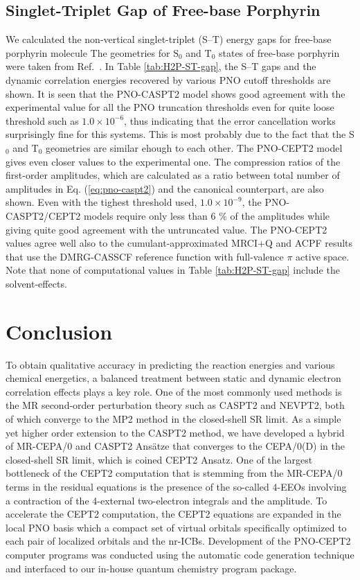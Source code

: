 \documentclass[aip,jcp,amsmath]{revtex4-1}
\begin{document}
\subsection{Singlet-Triplet Gap of Free-base Porphyrin}
%
We calculated the non-vertical singlet-triplet (S--T) energy gaps for free-base porphyrin molecule
%
The geometries for $\text{S}_0$ and $\text{T}_0$ states of free-base porphyrin were taken from Ref.~.
%
In Table \ref{tab:H2P-ST-gap}, the S--T gaps and the dynamic correlation energies recovered by various PNO cutoff thresholds are shown.
%
It is seen that the PNO-CASPT2 model shows good agreement with the experimental value for all the PNO truncation thresholds even for quite loose threshold such as $1.0\times 10^{-6}$, thus indicating that the error cancellation works surprisingly fine for this systems.
%
This is most probably due to the fact that the S${}_0$ and T${}_0$ geometries are similar ehough to each other.
%
The PNO-CEPT2 model gives even closer values to the experimental one.
%
The compression ratios of the first-order amplitudes, which are calculated as a ratio between total number of amplitudes in Eq. (\ref{eq:pno-caspt2}) and the canonical counterpart, are also shown.
%
Even with the tighest threshold used, $1.0\times 10^{-9}$, the PNO-CASPT2/CEPT2 models require only less than 6 $\%$ of the amplitudes while giving quite good agreement with the untruncated value.
%
The PNO-CEPT2 values agree well also to the cumulant-approximated MRCI+Q and ACPF results that use the DMRG-CASSCF reference function with full-valence $\pi$ active space.
%
Note that none of computational values in Table \ref{tab:H2P-ST-gap} include the solvent-effects.

\section{Conclusion}\label{Sec:Conclusion}

%
To obtain qualitative accuracy in predicting the reaction energies and various chemical energetics, a balanced treatment between static and dynamic electron correlation effects plays a key role.
%
One of the most commonly used methods is the MR second-order perturbation theory such as CASPT2 and NEVPT2, both of which converge to the MP2 method in the closed-shell SR limit.
%
As a simple yet higher order extension to the CASPT2 method, we have developed a hybrid of MR-CEPA/0 and CASPT2 Ans\"atze that converges to the CEPA/0(D) in the closed-shell SR limit, which is coined CEPT2 Ansatz.
%
One of the largest bottleneck of the CEPT2 computation that is stemming from the MR-CEPA/0 terms in the residual equations is the presence of the so-called 4-EEOs involving a contraction of the 4-external two-electron integrals and the amplitude.
%
To accelerate the CEPT2 computation, the CEPT2 equations are expanded in the local PNO basis which a compact set of virtual orbitals specifically optimized to each pair of localized orbitals and the nr-ICBs.
%
Development of the PNO-CEPT2 computer programs was conducted using the automatic code generation technique and interfaced to our in-house quantum chemistry program package.
\end{document}
